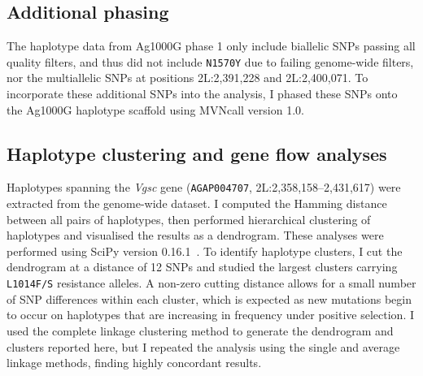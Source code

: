 \documentclass[a4paper,11pt,abstracton,hidelinks]{scrartcl}
\begin{document}
\subsection{Additional phasing}\label{subsec:methods-phasing}


The haplotype data from Ag1000G phase 1 only include biallelic SNPs passing all quality filters, and thus did not include \texttt{N1570Y} due to failing genome-wide filters, nor the multiallelic SNPs at positions 2L:2,391,228 and 2L:2,400,071.
%
To incorporate these additional SNPs into the analysis, I phased these SNPs onto the Ag1000G haplotype scaffold using MVNcall version 1.0.


\subsection{Haplotype clustering and gene flow analyses}\label{subsec:methods-hapclust}


Haplotypes spanning the \textit{Vgsc} gene (\texttt{AGAP004707}, 2L:2,358,158--2,431,617) were extracted from the genome-wide dataset.
%
I computed the Hamming distance between all pairs of haplotypes, then performed hierarchical clustering of haplotypes and visualised the results as a dendrogram.
%
These analyses were performed using SciPy version 0.16.1~\parencite{Virtanen2020}.
%
To identify haplotype clusters, I cut the dendrogram at a distance of 12 SNPs and studied the largest clusters carrying \texttt{L1014F/S} resistance alleles.
%
A non-zero cutting distance allows for a small number of SNP differences within each cluster, which is expected as new mutations begin to occur on haplotypes that are increasing in frequency under positive selection.
%
I used the complete linkage clustering method to generate the dendrogram and clusters reported here, but I repeated the analysis using the single and average linkage methods, finding highly concordant results.
\end{document}

